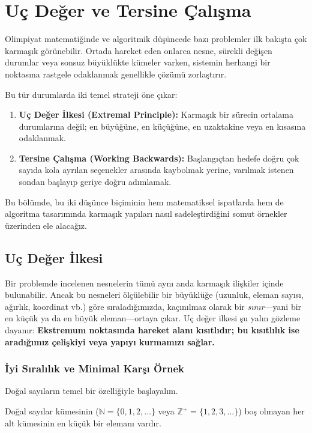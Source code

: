 \chapter[Uç Değer ve Tersine Çalışma · \textit{Orta}]{Uç Değer ve Tersine Çalışma}

Olimpiyat matematiğinde ve algoritmik düşüncede bazı problemler ilk bakışta çok karmaşık görünebilir. Ortada hareket eden onlarca nesne, sürekli değişen durumlar veya sonsuz büyüklükte kümeler varken, sistemin herhangi bir noktasına rastgele odaklanmak genellikle çözümü zorlaştırır. 

Bu tür durumlarda iki temel strateji öne çıkar:
\begin{enumerate}
    \item \textbf{Uç Değer İlkesi (Extremal Principle):} Karmaşık bir sürecin ortalama durumlarına değil; en büyüğüne, en küçüğüne, en uzaktakine veya en kısasına odaklanmak.
    \item \textbf{Tersine Çalışma (Working Backwards):} Başlangıçtan hedefe doğru çok sayıda kola ayrılan seçenekler arasında kaybolmak yerine, varılmak istenen sondan başlayıp geriye doğru adımlamak.
\end{enumerate}

Bu bölümde, bu iki düşünce biçiminin hem matematiksel ispatlarda hem de algoritma tasarımında karmaşık yapıları nasıl sadeleştirdiğini somut örnekler üzerinden ele alacağız.

\section{Uç Değer İlkesi}

Bir problemde incelenen nesnelerin tümü aynı anda karmaşık ilişkiler içinde bulunabilir. Ancak bu nesneleri ölçülebilir bir büyüklüğe (uzunluk, eleman sayısı, ağırlık, koordinat vb.) göre sıraladığımızda, kaçınılmaz olarak bir \emph{sınır}—yani bir en küçük ya da en büyük eleman—ortaya çıkar. Uç değer ilkesi şu yalın gözleme dayanır: \textbf{Ekstremum noktasında hareket alanı kısıtlıdır; bu kısıtlılık ise aradığımız çelişkiyi veya yapıyı kurmamızı sağlar.}

\subsection{İyi Sıralılık ve Minimal Karşı Örnek}

Doğal sayıların temel bir özelliğiyle başlayalım.

\begin{definition}
Doğal sayılar kümesinin ($\mathbb{N} = \{0, 1, 2, \dots\}$ veya $\mathbb{Z}^+ = \{1, 2, 3, \dots\}$) boş olmayan her alt kümesinin en küçük bir elemanı vardır.
\end{definition}


